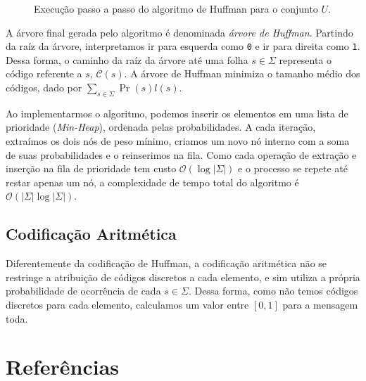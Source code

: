 \documentclass[a4paper, 12pt, english, brazilian]{article}
\begin{document}
\begin{figure}[H]
    \caption{Execução passo a passo do algoritmo de Huffman para o conjunto $U$.}
    \label{fig:huffman_steps}
\end{figure}

A árvore final gerada pelo algoritmo é denominada \textit{árvore de Huffman}. Partindo da raíz da árvore, interpretamos 
ir para esquerda como \texttt{0} e ir para direita como \texttt{1}. Dessa forma, o caminho da raíz da árvore até uma folha
$s \in \Sigma$ representa o código referente a $s$, $\mathcal{C}(s)$. A árvore de Huffman minimiza o tamanho médio dos
códigos, dado por $\sum_{s \in \Sigma}{\Pr(s)l(s)}$.

Ao implementarmos o algoritmo, podemos inserir os elementos em uma lista de prioridade (\textit{Min-Heap}), ordenada
pelas probabilidades. A cada iteração, extraímos os dois nós de peso mínimo, criamos um novo nó interno com a soma 
de suas probabilidades e o reinserimos na fila. Como cada operação de extração e inserção na fila de prioridade 
tem custo $\mathcal{O}(\log|\Sigma|)$ e o processo se repete até restar apenas um nó, a complexidade de tempo 
total do algoritmo é $\mathcal{O}(|\Sigma|\log|\Sigma|)$.

\subsection{Codificação Aritmética}
Diferentemente da codificação de Huffman, a codificação aritmética não se restringe a atribuição de códigos discretos a
cada elemento, e sim utiliza a própria probabilidade de ocorrência de cada $s \in \Sigma$. Dessa forma, como não temos
códigos discretos para cada elemento, calculamos um valor entre $[0, 1]$ para a mensagem toda.

\section{Referências}
\end{document}
